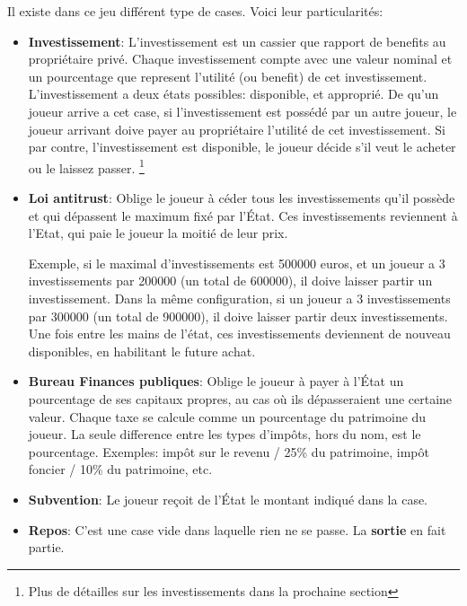 \documentclass[12pt]{article}
\begin{document}
        Il existe dans ce jeu différent type de cases. Voici leur particularités:
    \begin{itemize}
        \item \textbf{Investissement}: L'investissement est un cassier que rapport de benefits au propriétaire privé.
        		Chaque investissement compte avec une valeur nominal et un pourcentage que represent l'utilité (ou benefit) de cet investissement. 
		L'investissement a deux états possibles: disponible, et approprié.
		De qu'un joueur arrive a cet case,
		 si l'investissement est possédé par un autre joueur, le joueur arrivant doive payer au propriétaire l'utilité de cet investissement.
		Si par contre, l'investissement est disponible, le joueur décide s'il veut le acheter ou le laissez passer. \footnote{ Plus de détailles sur les investissements dans la prochaine section }
		
	
        \item \textbf{Loi antitrust}: Oblige le joueur à céder tous les investissements
    qu'il possède et qui dépassent le maximum fixé par l'État. 
    Ces investissements reviennent à l'Etat, qui paie le joueur la moitié de leur prix. 

    Exemple, si le maximal d'investissements est 500000 euros, et un joueur a 3 investissements par 200000 (un total de 600000), il doive laisser partir un investissement.  
    Dans la même configuration, si un joueur a 3 investissements par 300000 (un total de 900000), il doive laisser partir deux investissements. 
    Une fois entre les mains de l'état, ces investissements deviennent de nouveau disponibles,  
    en habilitant le future achat. 

        \item  \textbf{Bureau Finances publiques}: Oblige le joueur à payer à l'État un pourcentage de ses
    capitaux propres, au cas où ils dépasseraient une certaine valeur. Chaque taxe se calcule comme un pourcentage du patrimoine du joueur.
    La seule difference entre les types d'impôts, hors du nom, est le pourcentage. 
    Exemples: impôt sur le revenu / 25\% du patrimoine, impôt foncier / 10\% du patrimoine, etc.
        \item \textbf{Subvention}: Le joueur reçoit de l'État le montant indiqué dans la case.
        \item \textbf{Repos}: C'est une case vide dans laquelle rien ne se passe. La \textbf{sortie} en fait partie.
    \end{itemize}
    
    
\end{document}
